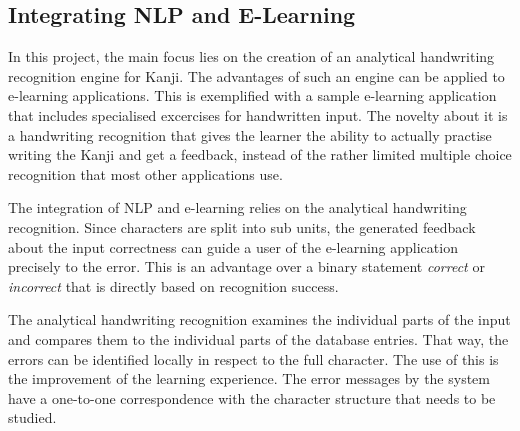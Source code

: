 
\subsection{Integrating NLP and E-Learning}
\label{sec:intro:integratingnlpandelearning}

In this project, the main focus lies on the creation of an analytical handwriting
recognition engine for Kanji. The advantages of such an engine can be applied to
e-learning applications. This is exemplified with a sample e-learning application
that includes specialised excercises for handwritten input.
The novelty about it is a handwriting recognition that gives the learner the 
ability to actually practise writing the Kanji and get a feedback, instead of 
the rather limited multiple choice recognition that most other applications use.

The integration of NLP and e-learning relies on the analytical handwriting
recognition. Since characters are split into sub units, the generated feedback 
about the input correctness can guide a user of the e-learning application 
precisely to the error. This is an advantage over a binary statement 
\emph{correct} or \emph{incorrect} that is directly based on recognition success.

The analytical handwriting recognition examines the individual parts of the
input and compares them to the individual parts of the database entries.
That way, the errors can be identified locally in respect to the full character.
The use of this is the improvement of the learning experience. The error messages
by the system have a one-to-one correspondence with the character 
structure that needs to be studied.